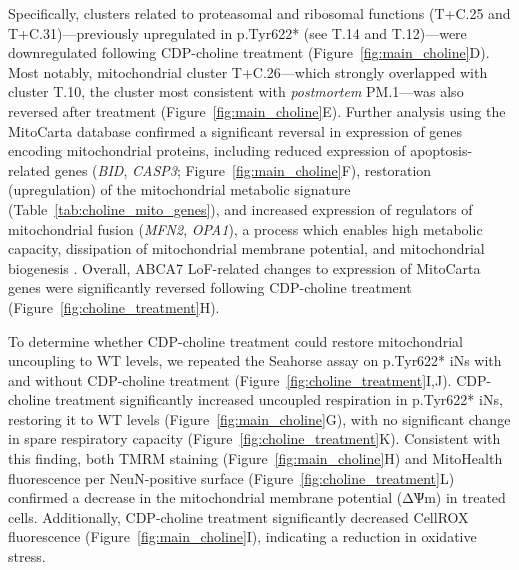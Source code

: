 \documentclass[12pt]{article}
\begin{document}
Specifically, clusters related to proteasomal and ribosomal functions (T+C.25 and T+C.31)—previously upregulated in p.Tyr622* (see T.14 and T.12)—were downregulated following CDP-choline treatment (Figure~\ref{fig:main_choline}D). Most notably, mitochondrial cluster T+C.26—which strongly overlapped with cluster T.10, the cluster most consistent with \textit{postmortem} PM.1—was also reversed after treatment (Figure~\ref{fig:main_choline}E). Further analysis using the MitoCarta database confirmed a significant reversal in expression of genes encoding mitochondrial proteins, including reduced expression of apoptosis-related genes (\textit{BID}, \textit{CASP3}; Figure~\ref{fig:main_choline}F), restoration (upregulation) of the mitochondrial metabolic signature (Table~\ref{tab:choline_mito_genes}), and increased expression of regulators of mitochondrial fusion (\textit{MFN2}, \textit{OPA1}), a process which enables high metabolic capacity, dissipation of mitochondrial membrane potential, and mitochondrial biogenesis \cite{Westermann2010-au}. Overall, ABCA7 LoF-related changes to expression of MitoCarta genes were significantly reversed following CDP-choline treatment (Figure~\ref{fig:choline_treatment}H). 

To determine whether CDP-choline treatment could restore mitochondrial uncoupling to WT levels, we repeated the Seahorse assay on p.Tyr622* iNs with and without CDP-choline treatment (Figure~\ref{fig:choline_treatment}I,J). CDP-choline treatment significantly increased uncoupled respiration in p.Tyr622* iNs, restoring it to WT levels (Figure~\ref{fig:main_choline}G), with no significant change in spare respiratory capacity (Figure~\ref{fig:choline_treatment}K). Consistent with this finding, both TMRM staining (Figure~\ref{fig:main_choline}H) and MitoHealth fluorescence per NeuN-positive surface (Figure~\ref{fig:choline_treatment}L) confirmed a decrease in the mitochondrial membrane potential (ΔѰm) in treated cells. Additionally, CDP-choline treatment significantly decreased CellROX fluorescence (Figure~\ref{fig:main_choline}I), indicating a reduction in oxidative stress. 
\end{document}
